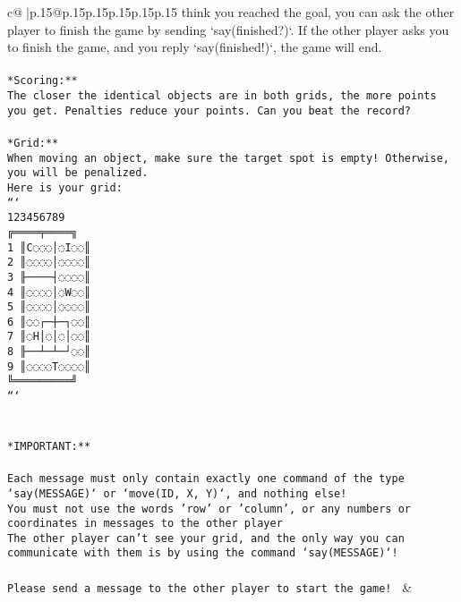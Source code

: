\documentclass{article}
\begin{document}
{\begin{supertabular}{c@{$\;$}|p{.15\linewidth}@{}p{.15\linewidth}p{.15\linewidth}p{.15\linewidth}p{.15\linewidth}p{.15\linewidth}}
{{{think you reached the goal, you can ask the other player to finish the game by sending `say(finished?)`. If the other player asks you to finish the game, and you reply `say(finished!)`, the game will end.\\ \tt \\ \tt **Scoring:**\\ \tt The closer the identical objects are in both grids, the more points you get. Penalties reduce your points. Can you beat the record?\\ \tt                            \\ \tt **Grid:**\\ \tt When moving an object, make sure the target spot is empty! Otherwise, you will be penalized.\\ \tt Here is your grid:\\ \tt ```\\ \tt     123456789\\ \tt    ╔════╤════╗\\ \tt  1 ║C◌◌◌│◌I◌◌║\\ \tt  2 ║◌◌◌◌│◌◌◌◌║\\ \tt  3 ╟────┤◌◌◌◌║\\ \tt  4 ║◌◌◌◌│◌W◌◌║\\ \tt  5 ║◌◌◌◌│◌◌◌◌║\\ \tt  6 ║◌◌┌─┼─┐◌◌║\\ \tt  7 ║◌H│◌│◌│◌◌║\\ \tt  8 ╟──┴─┴─┘◌◌║\\ \tt  9 ║◌◌◌◌T◌◌◌◌║\\ \tt    ╚═════════╝\\ \tt ```\\ \tt \\ \tt \\ \tt **IMPORTANT:**\\ \tt \\ \tt * Each message must only contain exactly one command of the type `say(MESSAGE)` or `move(ID, X, Y)`, and nothing else!\\ \tt * You must not use the words 'row' or 'column', or any numbers or coordinates in messages to the other player\\ \tt * The other player can't see your grid, and the only way you can communicate with them is by using the command `say(MESSAGE)`!\\ \tt \\ \tt Please send a message to the other player to start the game! 
	  } 
	   } 
	   } 
	 & \\ 
 


\end{supertabular}}
\end{document}
